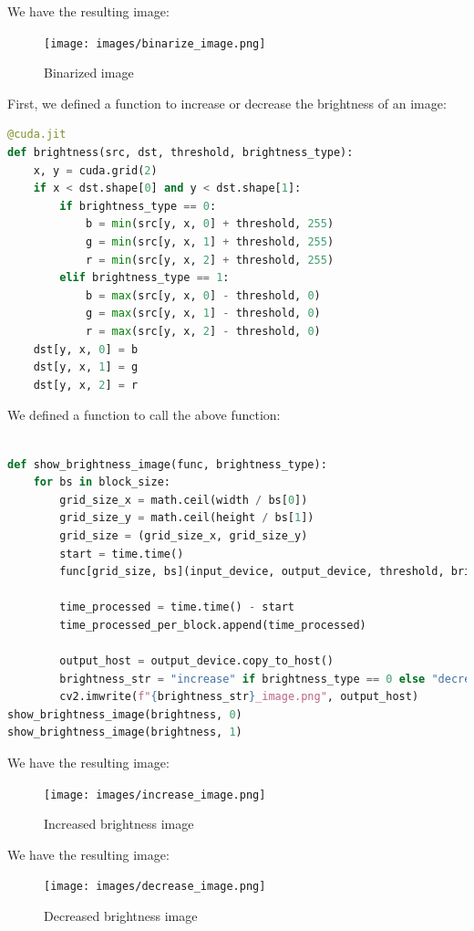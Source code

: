 \documentclass[12pt]{article}
\begin{document}
\noindent
We have the resulting image:
\begin{figure}[H]
\centering
    \texttt{[image: images/binarize\_image.png]}
    \caption{Binarized image}
\end{figure}

\noindent
First, we defined a function to increase or decrease the brightness of an image:
\begin{lstlisting}[language=Python]
@cuda.jit
def brightness(src, dst, threshold, brightness_type):
    x, y = cuda.grid(2)
    if x < dst.shape[0] and y < dst.shape[1]:
        if brightness_type == 0:
            b = min(src[y, x, 0] + threshold, 255)
            g = min(src[y, x, 1] + threshold, 255)
            r = min(src[y, x, 2] + threshold, 255)
        elif brightness_type == 1:
            b = max(src[y, x, 0] - threshold, 0)
            g = max(src[y, x, 1] - threshold, 0)
            r = max(src[y, x, 2] - threshold, 0)
    dst[y, x, 0] = b
    dst[y, x, 1] = g
    dst[y, x, 2] = r
\end{lstlisting}

\noindent
We defined a function to call the above function:
\begin{lstlisting}[language=Python]

def show_brightness_image(func, brightness_type):
    for bs in block_size:
        grid_size_x = math.ceil(width / bs[0])
        grid_size_y = math.ceil(height / bs[1])
        grid_size = (grid_size_x, grid_size_y)
        start = time.time()
        func[grid_size, bs](input_device, output_device, threshold, brightness_type)

        time_processed = time.time() - start
        time_processed_per_block.append(time_processed)

        output_host = output_device.copy_to_host()
        brightness_str = "increase" if brightness_type == 0 else "decrease"
        cv2.imwrite(f"{brightness_str}_image.png", output_host)
show_brightness_image(brightness, 0)
show_brightness_image(brightness, 1)
\end{lstlisting}

\noindent
We have the resulting image:
\begin{figure}[H]
\centering
    \texttt{[image: images/increase\_image.png]}
    \caption{Increased brightness image}
\end{figure}

\noindent
We have the resulting image:
\begin{figure}[H]
\centering
    \texttt{[image: images/decrease\_image.png]}
    \caption{Decreased brightness image}
\end{figure}
\end{document}
